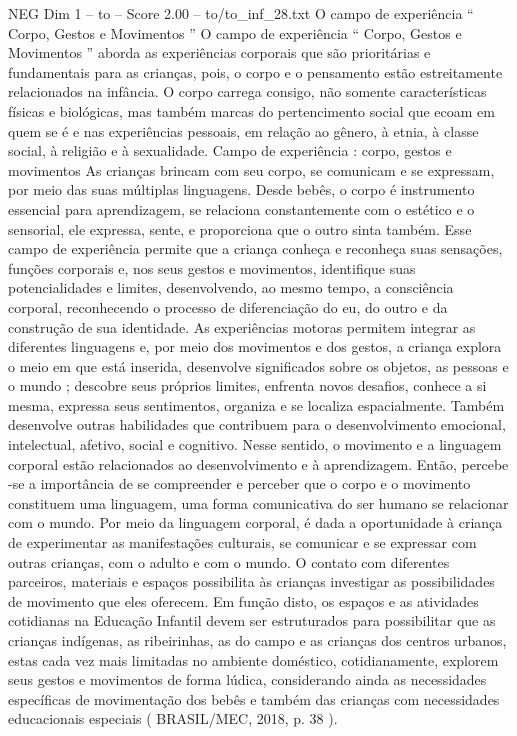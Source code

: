\begin{textsample}{NEG Dim 1 – to – Score 2.00 – to/to\_inf\_28.txt}  \label{ex:f1_neg_039}
O campo de experiência “ Corpo, Gestos e Movimentos ” O campo de experiência “ Corpo, Gestos e Movimentos ” aborda as experiências corporais que são prioritárias e fundamentais para as crianças, pois, o corpo e o pensamento estão estreitamente relacionados na infância.
O corpo carrega consigo, não somente características físicas e biológicas, mas também marcas do pertencimento social que ecoam em quem se é e nas experiências pessoais, em relação ao gênero, à etnia, à classe social, à religião e à sexualidade.
Campo de experiência : corpo, gestos e movimentos As crianças brincam com seu corpo, se comunicam e se expressam, por meio das suas múltiplas linguagens.
Desde bebês, o corpo é instrumento essencial para aprendizagem, se relaciona constantemente com o estético e o sensorial, ele expressa, sente, e proporciona que o outro sinta também.
Esse campo de experiência permite que a criança conheça e reconheça suas sensações, funções corporais e, nos seus gestos e movimentos, identifique suas potencialidades e limites, desenvolvendo, ao mesmo tempo, a consciência corporal, reconhecendo o processo de diferenciação do eu, do outro e da construção de sua identidade.
As experiências motoras permitem integrar as diferentes linguagens e, por meio dos movimentos e dos gestos, a criança explora o meio em que está inserida, desenvolve significados sobre os objetos, as pessoas e o mundo ; descobre seus próprios limites, enfrenta novos desafios, conhece a si mesma, expressa seus sentimentos, organiza e se localiza espacialmente.
Também desenvolve outras habilidades que contribuem para o desenvolvimento emocional, intelectual, afetivo, social e cognitivo.
Nesse sentido, o movimento e a linguagem corporal estão relacionados ao desenvolvimento e à aprendizagem.
Então, percebe -se a importância de se compreender e perceber que o corpo e o movimento constituem uma linguagem, uma forma comunicativa do ser humano se relacionar com o mundo.
Por meio da linguagem corporal, é dada a oportunidade à criança de experimentar as manifestações culturais, se comunicar e se expressar com outras crianças, com o adulto e com o mundo.
O contato com diferentes parceiros, materiais e espaços possibilita às crianças investigar as possibilidades de movimento que eles oferecem.
Em função disto, os espaços e as atividades cotidianas na Educação Infantil devem ser estruturados para possibilitar que as crianças indígenas, as ribeirinhas, as do campo e as crianças dos centros urbanos, estas cada vez mais limitadas no ambiente doméstico, cotidianamente, explorem seus gestos e movimentos de forma lúdica, considerando ainda as necessidades específicas de movimentação dos bebês e também das crianças com necessidades educacionais especiais ( BRASIL/MEC, 2018, p. 38 ).

\end{textsample}
